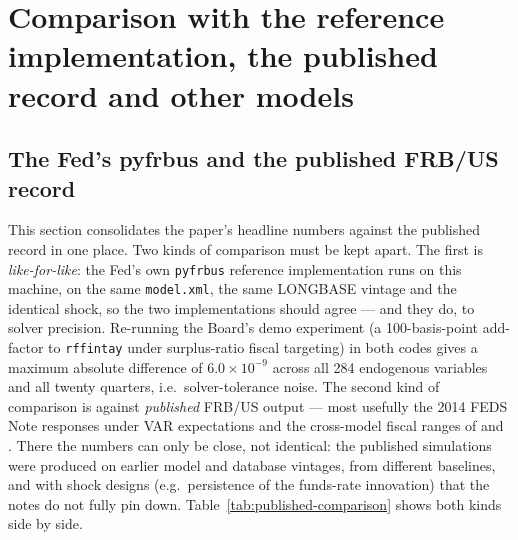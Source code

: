\section{Comparison with the reference implementation, the published record and other models}
\label{sec:comparison}

\subsection{The Fed's pyfrbus and the published FRB/US record}
\label{sec:cmp-published}

This section consolidates the paper's headline numbers against the published record in one place. Two kinds of comparison must be kept apart. The first is \emph{like-for-like}: the Fed's own \texttt{pyfrbus} reference implementation runs on this machine, on the same \texttt{model.xml}, the same LONGBASE vintage and the identical shock, so the two implementations should agree --- and they do, to solver precision. Re-running the Board's demo experiment (a 100-basis-point add-factor to \texttt{rffintay} under surplus-ratio fiscal targeting) in both codes gives a maximum absolute difference of $6.0\times10^{-9}$ across all 284 endogenous variables and all twenty quarters, i.e.\ solver-tolerance noise. The second kind of comparison is against \emph{published} FRB/US output --- most usefully the 2014 FEDS Note responses under VAR expectations \citep{brayton2014note} and the cross-model fiscal ranges of \citet{coenen2012effects} and \citet{whalen2015fiscal}. There the numbers can only be close, not identical: the published simulations were produced on earlier model and database vintages, from different baselines, and with shock designs (e.g.\ persistence of the funds-rate innovation) that the notes do not fully pin down. Table~\ref{tab:published-comparison} shows both kinds side by side.


